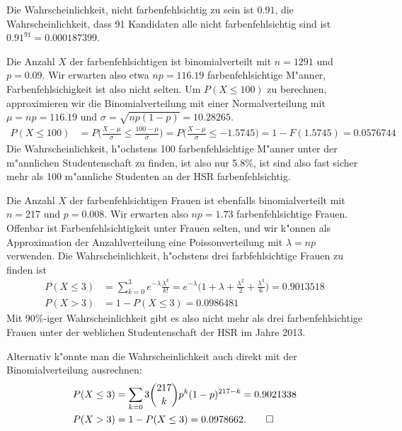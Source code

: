 \begin{loesung}
\begin{teilaufgaben}
\item
Die Wahrscheinlichkeit, nicht farbenfehlsichtig zu sein ist $0.91$, die
Wahrscheinlichkeit, dass 91 Kandidaten alle nicht farbenfehlsichtig sind
ist $0.91^{91}=0.000187399$.
\item
Die Anzahl $X$ der farbenfehlsichtigen ist binomialverteilt mit $n=1291$ und
$p=0.09$. Wir erwarten also etwa $np=116.19$ farbenfehlsichtige M"anner,
Farbenfehlsichigkeit ist also nicht selten. Um $P(X\le 100)$ zu
berechnen, approximieren wir die Binomialverteilung mit einer Normalverteilung
mit $\mu=np=116.19$ und $\sigma=\sqrt{np(1-p)}=10.28265$.
\begin{align*}
P(X\le 100)
&=
P\biggl(
\frac{X-\mu}{\sigma}\le \frac{100-\mu}{\sigma}
\biggr)
=
P\biggl(
\frac{X-\mu}{\sigma}\le -1.5745
\biggr)
=
1-F(1.5745)
=
0.0576744
\end{align*}
Die Wahrscheinlichkeit, h"ochstens 100 farbenfehlsichtige M"anner unter
der m"annlichen Studentenschaft zu finden, ist also nur 5.8\%, ist sind
also fast sicher mehr als 100 m"annliche Studenten an der HSR
farbenfehlsichtig.
\item
Die Anzahl $X$ der farbenfehlsichtigen Frauen ist ebenfalls binomialverteilt
mit $n=217$ und $p=0.008$. Wir erwarten also $np=1.73$ farbenfehlsichtige
Frauen. Offenbar ist Farbenfehlsichtigkeit unter Frauen selten, und wir
k"onnen als Approximation der Anzahlverteilung eine Poissonverteilung mit
$\lambda = np$ verwenden.
Die Wahrscheinlichkeit, h"ochstens drei farbfehlsichtige Frauen zu finden
ist
\begin{align*}
P(X\le 3)&=\sum_{k=0}^3 e^{-\lambda}\frac{\lambda^k}{k!}=
e^{-\lambda}\biggl(
1+\lambda +\frac{\lambda^2}{2}+\frac{\lambda^3}{6}
\biggr)
=
0.9013518
\\
P(X>3)&=1-P(X\le 3)=
0.0986481
\end{align*}
Mit 90\%-iger Wahrscheinlichkeit gibt es also nicht mehr als drei
farbenfehlsichtige Frauen unter der weblichen Studentenschaft
der HSR im Jahre 2013.

Alternativ k"onnte man die Wahrscheinlichkeit auch direkt mit der 
Binomialverteilung ausrechnen:
\begin{align*}
P(X\le 3)
&=
\sum_{k=0}3\binom{217}{k}p^k(1-p)^{217-k}=0.9021338
\\
P(X>3)&=1-P(X\le 3)=0.0978662.
\qedhere
\end{align*}
\end{teilaufgaben}
\end{loesung}

